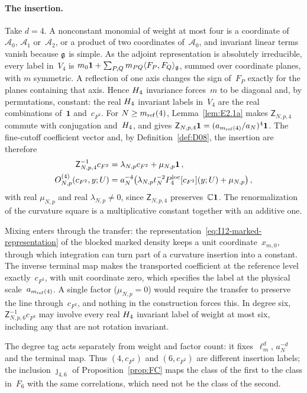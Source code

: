 \paragraph{The insertion.} Take $d=4$. A nonconstant monomial of weight at most four is a coordinate of~$\mathcal A_0$, $\mathcal A_1$ or~$\mathcal A_2$, or a product of two coordinates of~$\mathcal A_0$, and invariant linear terms vanish because $\mathfrak{g}$ is simple. As the adjoint representation is absolutely irreducible, every label in~$V_4$ is $m_0\mathbf1+\sum_{P,Q}m_{PQ}\langle F_P,F_Q\rangle_{\mathfrak{g}}$, summed over coordinate planes, with $m$ symmetric. A reflection of one axis changes the sign of~$F_P$ exactly for the planes containing that axis. Hence $H_4$ invariance forces~$m$ to be diagonal and, by permutations, constant: the real $H_4$ invariant labels in~$V_4$ are the real combinations of~$\mathbf1$ and~$c_{F^2}$. For $N\ge m_{\mathrm{ref}}(4)$, Lemma~\ref{lem:E2.1a} makes $\mathsf Z_{N,p,4}$ commute with conjugation and~$H_4$, and gives $\mathsf Z_{N,p,4}\mathbf1=(a_{m_{\mathrm{ref}}(4)}/a_N)^4\mathbf1$. The fine-cutoff coefficient vector and, by Definition~\ref{def:D08}, the insertion are therefore
\begin{align*}
\mathsf Z_{N,p,4}^{-1}c_{F^2}&=\lambda_{N,p}c_{F^2}+\mu_{N,p}\mathbf1\,,\\
O^{(4)}_{N,p}(c_{F^2},y;U)&=a_N^{-4}\bigl(\lambda_{N,p}t_N^{-2}P_{4}^{\mathrm{loc}}[c_{F^2}](y;U)+\mu_{N,p}\bigr)\,,
\end{align*}
with real $\mu_{N,p}$ and real $\lambda_{N,p}\ne0$, since $\mathsf Z_{N,p,4}$ preserves~$\mathbb{C}\mathbf1$. The renormalization of the curvature square is a multiplicative constant together with an additive one.

Mixing enters through the transfer: the representation~\eqref{eq:I12-marked-representation} of the blocked marked density keeps a unit coordinate~$x_{m,0}$, through which integration can turn part of a curvature insertion into a constant. The inverse terminal map makes the transported coefficient at the reference level exactly~$c_{F^2}$, with unit coordinate zero, which specifies the label at the physical scale~$a_{m_{\mathrm{ref}}(4)}$. A single factor ($\mu_{N,p}=0$) would require the transfer to preserve the line through~$c_{F^2}$, and nothing in the construction forces this. In degree six, $\mathsf Z_{N,p,6}^{-1}c_{F^2}$ may involve every real $H_4$ invariant label of weight at most six, including any that are not rotation invariant.

The degree tag acts separately from weight and factor count: it fixes~$\ell_m^d$, $a_N^{-d}$ and the terminal map. Thus $(4,c_{F^2})$ and $(6,c_{F^2})$ are different insertion labels; the inclusion $\jmath_{4,6}$ of Proposition~\ref{prop:FC} maps the class of the first to the class in~$F_6$ with the same correlations, which need not be the class of the second.

